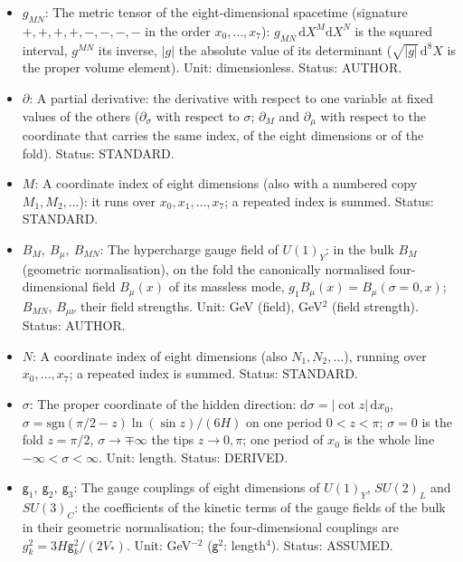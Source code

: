 \documentclass[
  10pt,
]{article}
\providecommand{\tightlist}{%
  \setlength{\itemsep}{0pt}\setlength{\parskip}{0pt}}
\begin{document}
\begin{itemize}
\tightlist
\item
  \(g_{MN}\): The metric tensor of the eight-dimensional spacetime
  (signature \(+,+,+,+,-,-,-,-\) in the order \(x_0, \dots, x_7\)):
  \(g_{MN}\,\mathrm{d}X^M\mathrm{d}X^N\) is the squared interval,
  \(g^{MN}\) its inverse, \(\lvert g\rvert\) the absolute value of its
  determinant (\(\sqrt{\lvert g\rvert}\,\mathrm{d}^8X\) is the proper
  volume element). Unit: dimensionless. Status: AUTHOR.
\item
  \(\partial\): A partial derivative: the derivative with respect to one
  variable at fixed values of the others (\(\partial_\sigma\) with
  respect to \(\sigma\); \(\partial_M\) and \(\partial_\mu\) with
  respect to the coordinate that carries the same index, of the eight
  dimensions or of the fold). Status: STANDARD.
\item
  \(M\): A coordinate index of eight dimensions (also with a numbered
  copy \(M_1, M_2, \dots\)): it runs over \(x_0, x_1, \dots, x_7\); a
  repeated index is summed. Status: STANDARD.
\item
  \(B_M,\ B_\mu,\ B_{MN}\): The hypercharge gauge field of \(U(1)_Y\):
  in the bulk \(B_M\) (geometric normalisation), on the fold the
  canonically normalised four-dimensional field \(B_\mu(x)\) of its
  massless mode, \(g_1B_\mu(x) = B_\mu(\sigma = 0, x)\); \(B_{MN}\),
  \(B_{\mu\nu}\) their field strengths. Unit: GeV (field), GeV\(^2\)
  (field strength). Status: AUTHOR.
\item
  \(N\): A coordinate index of eight dimensions (also
  \(N_1, N_2, \dots\)), running over \(x_0, \dots, x_7\); a repeated
  index is summed. Status: STANDARD.
\item
  \(\sigma\): The proper coordinate of the hidden direction:
  \(\mathrm{d}\sigma = \lvert\cot z\rvert\,\mathrm{d}x_0\),
  \(\sigma = \mathrm{sgn}(\pi/2 - z)\ln(\sin z)/(6H)\) on one period
  \(0 < z < \pi\); \(\sigma = 0\) is the fold \(z = \pi/2\),
  \(\sigma \to \mp\infty\) the tips \(z \to 0, \pi\); one period of
  \(x_0\) is the whole line \(-\infty < \sigma < \infty\). Unit: length.
  Status: DERIVED.
\item
  \(\mathsf{g}_1,\ \mathsf{g}_2,\ \mathsf{g}_3\): The gauge couplings of
  eight dimensions of \(U(1)_Y\), \(SU(2)_L\) and \(SU(3)_C\): the
  coefficients of the kinetic terms of the gauge fields of the bulk in
  their geometric normalisation; the four-dimensional couplings are
  \(g_k^2 = 3H\mathsf{g}_k^2/(2V_*)\). Unit: GeV\(^{-2}\)
  (\(\mathsf{g}^2\): length\(^4\)). Status: ASSUMED.

\end{itemize}
\end{document}

